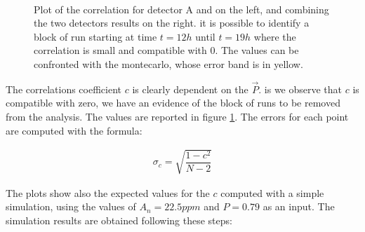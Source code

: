 \begin{figure}[hbtp]
\centering
{} \\
\caption{Plot of the correlation for detector A and on the left, and combining the two detectors results on the right. it is possible to identify a block of run starting at time $t = 12 h$ until $t = 19 h$ where the correlation is small and compatible with $0$. The values can be confronted with the montecarlo, whose error band is in yellow.}
\label{fig:PolarityCheck}
\end{figure}

The correlations coefficient $c$ is clearly dependent on the $\vec{P}$. is we observe that $c$ is compatible with zero, we have an evidence of the block of runs to be removed from the analysis.
The values are reported in figure \ref{fig:PolarityCheck}. The errors for each point are computed with the formula:

\begin{align*}
\sigma_{c} = \sqrt{\dfrac{1 - c^{2}}{N - 2}}
\end{align*} 

The plots show also the expected values for the $c$ computed with a simple simulation, using the values of $A_{n} = 22.5 ppm$ and $P = 0.79$ as an input. The simulation results are obtained following these steps:

